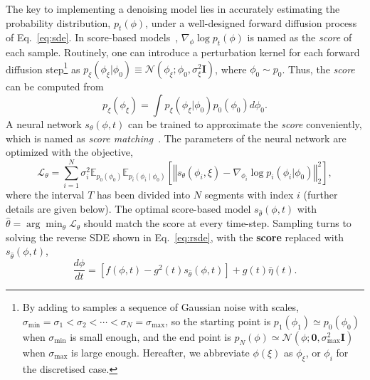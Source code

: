 The key to implementing a denoising model lies in accurately estimating the probability distribution, $p_t(\phi)$, under a well-designed forward diffusion process of Eq.~\eqref{eq:sde}. In score-based models~\cite{NEURIPS2019_3001ef25,song2021scorebased}, $\nabla_{\phi}\log p_t(\phi)$ is named as the \textit{score} of each sample. Routinely, one can introduce a perturbation kernel for each forward diffusion step\footnote{By 
adding to samples a sequence of Gaussian noise with scales, $\sigma_\text{min} = \sigma_1<\sigma_2<\cdots<\sigma_N = \sigma_\text{max}$, so the starting point is $p_1(\phi_1)\simeq p_0(\phi_0)$ when $\sigma_\text{min}$ is small enough, and the end point is $p_N(\phi)\simeq \mathcal{N}(\phi ; \mathbf{0}, \sigma_\text{max}^2 \mathbf{I})$ when $\sigma_\text{max}$ is large enough. Hereafter, we abbreviate $\phi(\xi)$ as $\phi_\xi$, or $\phi_i$ for the discretised case.} 
as $p_\xi(\phi_\xi | \phi_0)  \equiv \mathcal{N}(\phi_\xi ; \phi_0, \sigma_\xi^2 \mathbf{I})$, where $\phi_0\sim p_0 $. Thus, the \textit{score} can be computed from 
%
\begin{equation}
    p_{\xi}(\phi_\xi) = \int p_{\xi}(\phi_\xi|\phi_0) p_0(\phi_0) d\phi_0.    
\end{equation} 
%
A neural network $s_\theta(\phi,t)$ can be trained to approximate the \textit{score} conveniently, which is named as \textit{score matching}~\cite{Aapo:2005scb,Vincent:2011scb}. The parameters of the neural network are optimized with the objective,
\begin{equation}
    \mathcal{L}_{\theta}= \sum_{i=1}^{N}\sigma_{i}^{2}\mathbb{E}_{p_0(\phi_0)}\mathbb{E}_{p_i(\phi_i\mid\phi_0)}
    \left[ \left\Vert s_\theta(\phi_i,\xi)-\nabla_{\phi_i}\log p_i(\phi_i|\phi_0)\right\Vert_{2}^{2}
    \right],
    \label{eq:objective}
\end{equation}
where the interval $T$ has been divided into $N$ segments with index $i$ (further details are given below). The optimal score-based model $s_{\hat{\theta}}(\phi,t)$ with $\hat{\theta}=\arg\operatorname*{min}_{\theta}\mathcal{L}_{\theta}$ should match the score at every time-step. Sampling turns to solving the reverse SDE shown in Eq.~\eqref{eq:rsde}, with the \textbf{score} replaced with $s_{\hat{\theta}}(\phi,t)$,
\begin{equation}
  \frac{d\phi}{dt} = \left[ f(\phi, t) - g^2(t)s_{\hat{\theta}}(\phi,t) \right] + g(t) \bar{\eta}(t).
\end{equation}


